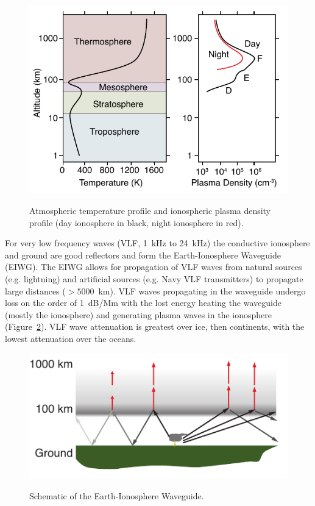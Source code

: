 \begin{figure}[ht!]
	\centering
	\includegraphics[scale=1]{Introduction/Figures/ionosphere.pdf}\\
	\caption{Atmospheric temperature profile and ionospheric plasma density profile (day ionosphere in black, night ionosphere in red).
		     }
	\label{intro:fig:ionosphere}
\end{figure}

For very low frequency waves (VLF, 1~kHz to 24~kHz) the conductive ionosphere and ground are good reflectors and form the Earth-Ionosphere Waveguide (EIWG).
The EIWG allows for propagation of VLF waves from natural sources (e.g. lightning) and artificial sources (e.g. Navy VLF transmitters) to propagate large distances ($>5000$~km).
VLF waves propagating in the waveguide undergo loss on the order of 1~dB/Mm with the lost energy  heating the waveguide (mostly the ionosphere) and generating plasma waves in the ionosphere (Figure~\ref{intro:fig:eiwg}).
VLF wave attenuation is greatest over ice, then continents, with the lowest attenuation over the oceans.

\begin{figure}[ht!]
	\centering
	\includegraphics[scale=1]{Introduction/Figures/eiwg.pdf}\\
	\caption{Schematic of the Earth-Ionosphere Waveguide.}
	\label{intro:fig:eiwg}
\end{figure}

